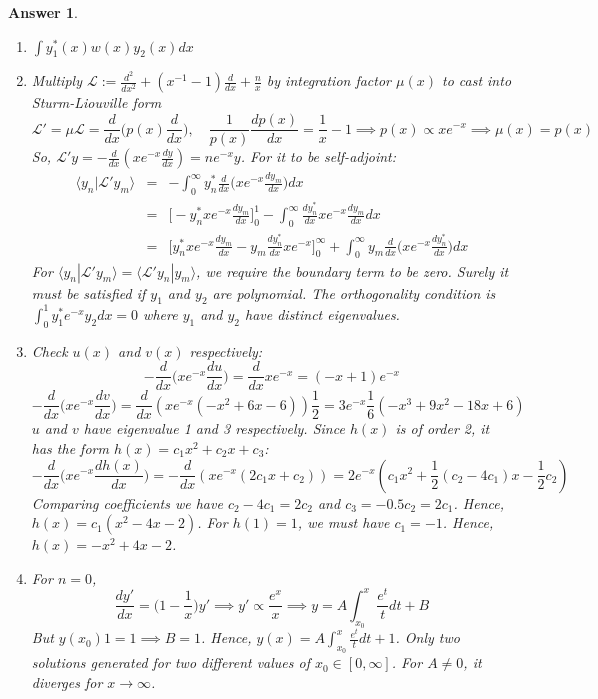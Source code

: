 \documentclass[a4paper]{article}
\newtheorem{ans}{Answer}[section]
\theoremstyle{new}
\begin{document}
\begin{ans}\leavevmode
\begin{enumerate}[label=(\roman*)]
\item $\int y_1^*(x)w(x)y_2(x)dx$
\item Multiply $\mathcal{L}:=\frac{d^2}{dx^2}+(x^{-1}-1)\frac{d}{dx}+\frac{n}{x}$ by integration factor $\mu(x)$ to cast into Sturm-Liouville form $$\mathcal{L}'=\mu\mathcal{L}=\frac{d}{dx}\bigg(p(x)\frac{d}{dx}\bigg),\quad\frac{1}{p(x)}\frac{dp(x)}{dx}=\frac{1}{x}-1\implies p(x)\propto xe^{-x}\implies \mu(x)=p(x)$$
So, $\mathcal{L}'y=-\frac{d}{dx}(xe^{-x}\frac{dy}{dx})=ne^{-x}y$. For it to be self-adjoint:
\begin{eqnarray}
\langle y_n|\mathcal{L}'y_m\rangle&=&-\int_0^\infty y_n^*\frac{d}{dx}\bigg(xe^{-x}\frac{dy_m}{dx}\bigg)dx\nonumber\\&=&\bigg[-y_n^*xe^{-x}\frac{dy_m}{dx}\bigg]_0^1-\int_0^\infty \frac{dy_n^*}{dx}xe^{-x}\frac{dy_m}{dx}dx\nonumber\\&=&\bigg[y_n^*xe^{-x}\frac{dy_m}{dx}-y_m\frac{dy_n^*}{dx}xe^{-x}\bigg]_0^\infty+\int_0^\infty y_m\frac{d}{dx}\bigg(xe^{-x}\frac{dy_n^*}{dx}\bigg)dx\nonumber
\end{eqnarray}
For $\langle y_n|\mathcal{L}'y_m\rangle=\langle\mathcal{L}'y_n|y_m\rangle$, we require the boundary term to be zero. Surely it must be satisfied if $y_1$ and $y_2$ are polynomial. The orthogonality condition is $\int_0^1y_1^*e^{-x}y_2dx=0$ where $y_1$ and $y_2$ have distinct eigenvalues.
\item Check $u(x)$ and $v(x)$ respectively:
$$-\frac{d}{dx}\bigg(xe^{-x}\frac{du}{dx}\bigg)=\frac{d}{dx}xe^{-x}=(-x+1)e^{-x}$$
$$-\frac{d}{dx}\bigg(xe^{-x}\frac{dv}{dx}\bigg)=\frac{d}{dx}(xe^{-x}(-x^2+6x-6))\frac{1}{2}=3e^{-x}\frac{1}{6}(-x^3+9x^2-18x+6)$$
$u$ and $v$ have eigenvalue 1 and 3 respectively. Since $h(x)$ is of order 2, it has the form $h(x)=c_1x^2+c_2x+c_3$:
$$-\frac{d}{dx}\bigg(xe^{-x}\frac{dh(x)}{dx}\bigg)=-\frac{d}{dx}(xe^{-x}(2c_1x+c_2))=2e^{-x}(c_1x^2+\frac{1}{2}(c_2-4c_1)x-\frac{1}{2}c_2)$$
Comparing coefficients we have $c_2-4c_1=2c_2$ and $c_3=-0.5c_2=2c_1$. Hence, $h(x)=c_1(x^2-4x-2)$. For $h(1)=1$, we must have $c_1=-1$. Hence, $h(x)=-x^2+4x-2$.
\item For $n=0$,
$$\frac{dy'}{dx}=\bigg(1-\frac{1}{x}\bigg)y'\implies y'\propto \frac{e^x}{x}\implies y=A\int_{x_0}^x\frac{e^t}{t}dt+B$$
But $y(x_0)1=1\implies B=1$. Hence, $y(x)=A\int_{x_0}^x\frac{e^t}{t}dt+1$. Only two solutions generated for two different values of $x_0\in[0,\infty]$. For $A\neq 0$, it diverges for $x\rightarrow\infty$.
\end{enumerate}
\end{ans}
\end{document}
